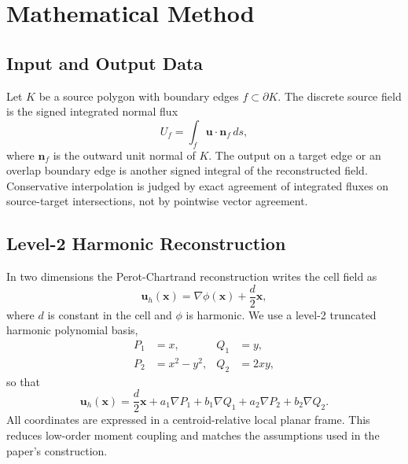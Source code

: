 \documentclass[11pt]{article}
\newcommand{\uh}{\mathbf{u}_h}
\newcommand{\x}{\mathbf{x}}
\newcommand{\n}{\mathbf{n}}
\begin{document}


\section{Mathematical Method}

\subsection{Input and Output Data}

Let \(K\) be a source polygon with boundary edges \(f \subset \partial K\).
The discrete source field is the signed integrated normal flux
\begin{equation}
  U_f = \int_f \mathbf{u}\cdot\n_f\, ds,
  \label{eq:edge_flux}
\end{equation}
where \(\n_f\) is the outward unit normal of \(K\).  The output on a target edge
or an overlap boundary edge is another signed integral of the reconstructed
field.  Conservative interpolation is judged by exact agreement of integrated
fluxes on source-target intersections, not by pointwise vector agreement.

\subsection{Level-2 Harmonic Reconstruction}

In two dimensions the Perot-Chartrand reconstruction writes the cell field as
\begin{equation}
  \uh(\x) = \nabla\phi(\x) + \frac{d}{2}\x,
  \label{eq:pc_reconstruction}
\end{equation}
where \(d\) is constant in the cell and \(\phi\) is harmonic.  We use a level-2
truncated harmonic polynomial basis,
\begin{align}
  P_1 &= x, & Q_1 &= y,\\
  P_2 &= x^2-y^2, & Q_2 &= 2xy,
  \label{eq:basis}
\end{align}
so that
\begin{equation}
  \uh(\x)
    = \frac{d}{2}\x
      + a_1\nabla P_1 + b_1\nabla Q_1
      + a_2\nabla P_2 + b_2\nabla Q_2.
  \label{eq:level2}
\end{equation}
All coordinates are expressed in a centroid-relative local planar
frame.  This reduces low-order moment coupling and matches the assumptions used
in the paper's construction.
\end{document}
